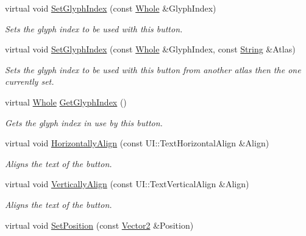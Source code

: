 \begin{DoxyCompactItemize}
virtual void \hyperlink{classphys_1_1UI_1_1TextButton_af421f9558333657e0d2d81c33fbf9eb3}{SetGlyphIndex} (const \hyperlink{namespacephys_a460f6bc24c8dd347b05e0366ae34f34a}{Whole} \&GlyphIndex)
\begin{DoxyCompactList}\small\item\em Sets the glyph index to be used with this button. \item\end{DoxyCompactList}\item 
virtual void \hyperlink{classphys_1_1UI_1_1TextButton_a731b313c31cea79f92180e18ab1ad783}{SetGlyphIndex} (const \hyperlink{namespacephys_a460f6bc24c8dd347b05e0366ae34f34a}{Whole} \&GlyphIndex, const \hyperlink{namespacephys_aa03900411993de7fbfec4789bc1d392e}{String} \&Atlas)
\begin{DoxyCompactList}\small\item\em Sets the glyph index to be used with this button from another atlas then the one currently set. \item\end{DoxyCompactList}\item 
virtual \hyperlink{namespacephys_a460f6bc24c8dd347b05e0366ae34f34a}{Whole} \hyperlink{classphys_1_1UI_1_1TextButton_a93f53557fcea98ea2426b798628e310f}{GetGlyphIndex} ()
\begin{DoxyCompactList}\small\item\em Gets the glyph index in use by this button. \item\end{DoxyCompactList}\item 
virtual void \hyperlink{classphys_1_1UI_1_1TextButton_ae64641f1a7c54e869a44adbe6b0d9c0a}{HorizontallyAlign} (const UI::TextHorizontalAlign \&Align)
\begin{DoxyCompactList}\small\item\em Aligns the text of the button. \item\end{DoxyCompactList}\item 
virtual void \hyperlink{classphys_1_1UI_1_1TextButton_adbd6f7c69f78dfcba1054591e3afb838}{VerticallyAlign} (const UI::TextVerticalAlign \&Align)
\begin{DoxyCompactList}\small\item\em Aligns the text of the button. \item\end{DoxyCompactList}\item 
virtual void \hyperlink{classphys_1_1UI_1_1TextButton_a52230b17c81743438bc0cd08eb49a5c5}{SetPosition} (const \hyperlink{classphys_1_1Vector2}{Vector2} \&Position)

\end{DoxyCompactItemize}

